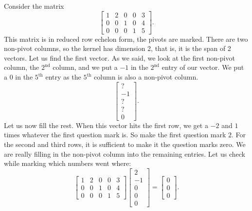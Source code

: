 \begin{example}
Consider the matrix
\begin{equation*}
\begin{bmatrix}
\boxed{1} & 2 & 0 & 0 & 3 \\
0 & 0 & \boxed{1} & 0 & 4 \\
0 & 0 & 0 & \boxed{1} & 5
\end{bmatrix} .
\end{equation*}
This matrix is in reduced row echelon form, the pivots are marked.
There are two non-pivot columns, so the kernel has dimension 2, that
is, it is the span of 2 vectors.  Let us find the first vector.
As we said, we look at the first non-pivot column, the $2^{\text{nd}}$ column, 
and we put a $-1$ in the
$2^{\text{nd}}$ entry of our vector.  We put a $0$ in the $5^{\text{th}}$
entry as the $5^{\text{th}}$ column is also a non-pivot column.
\begin{equation*}
\begin{bmatrix}
? \\ -1 \\ ? \\ ? \\ 0
\end{bmatrix} .
\end{equation*}
Let us now fill the rest.  When this vector hits the first row, we get a
$-2$ and $1$ times whatever the first question mark is.  So make the first
question mark $2$.  For the second and third rows, it is sufficient to make
it the question marks zero.  We are really filling in the non-pivot column
into the remaining entries. Let us check while marking which numbers went
where:
\begin{equation*}
\begin{bmatrix}
1 & \boxed{2} & 0 & 0 & 3 \\
0 & \boxed{0} & 1 & 0 & 4 \\
0 & \boxed{0} & 0 & 1 & 5
\end{bmatrix} 
\begin{bmatrix}
\boxed{2} \\ -1 \\ \boxed{0} \\ \boxed{0} \\ 0
\end{bmatrix}
=
\begin{bmatrix}
0 \\ 0 \\ 0
\end{bmatrix}
.
\end{equation*}

\end{example}
